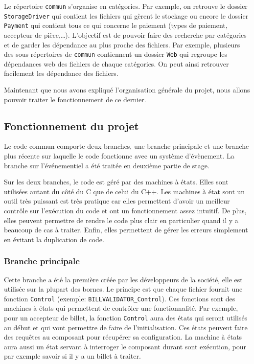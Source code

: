 \documentclass[a4paper]{article}
\begin{document}
Le répertoire \verb|commun| s'organise en catégories. Par exemple, on retrouve
le dossier \verb|StorageDriver| qui contient les fichiers qui gèrent le stockage
ou encore le dossier \verb|Payment| qui contient tous ce qui concerne le
paiement (types de paiement, accepteur de pièce,\dots). L'objectif est de
pouvoir faire des recherche par catégories et de garder les dépendance au plus
proche des fichiers. Par exemple, plusieurs des sous répertoires de
\verb|commun| contiennent un dossier \verb|Web| qui regroupe les dépendances web
des fichiers de chaque catégories. On peut ainsi retrouver facilement les
dépendance des fichiers.

Maintenant que nous avons expliqué l'organisation générale du projet, nous
allons pouvoir traiter le fonctionnement de ce dernier.

\subsection{Fonctionnement du projet}

Le code commun comporte deux branches, une branche principale et une branche
plus récente sur laquelle le code fonctionne avec un système d'évènement. La
branche sur l'événementiel a été traitée en deuxième partie de stage.

Sur les deux branches, le code est géré par des machines à états. Elles sont
utilisées autant du côté du C que de celui du C++. Les machines à état sont un
outil très puissant est très pratique car elles permettent d'avoir un meilleur
contrôle sur l'exécution du code et ont un fonctionnement assez intuitif. De
plus, elles peuvent permettre de rendre le code plus clair en particulier quand
il y a beaucoup de cas à traiter. Enfin, elles permettent de gérer les erreurs
simplement en évitant la duplication de code.

\subsubsection{Branche principale}

Cette branche a été la première créée par les développeurs de la société, elle
est utilisée sur la plupart des bornes. Le principe est que chaque fichier
fournit une fonction \verb|Control| (exemple: \verb|BILLVALIDATOR_Control|). Ces
fonctions sont des machines à états qui permettent de contrôler une
fonctionnalité. Par exemple, pour un accepteur de billet, la fonction
\verb|Control| aura des états qui seront utilisés au début et qui vont permettre
de faire de l'initialisation. Ces états peuvent faire des requêtes au composant
pour récupérer sa configuration. La machine à états aura aussi un état servant à
interroger le composant durant sont exécution, pour par exemple savoir si il y a
un billet à traiter.
\end{document}
